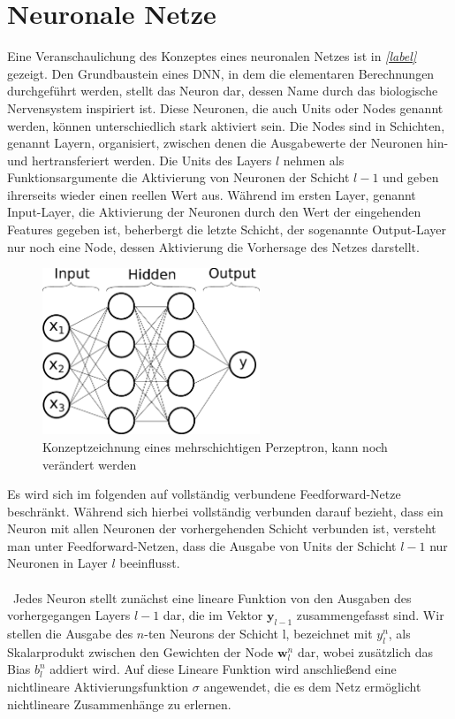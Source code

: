 \section{Neuronale Netze}
Eine Veranschaulichung des Konzeptes eines neuronalen Netzes ist in \textit{\autoref{label}} gezeigt.
Den Grundbaustein eines DNN, in dem die elementaren Berechnungen durchgeführt werden, stellt das Neuron dar, dessen Name durch das biologische Nervensystem inspiriert ist.
Diese Neuronen, die auch Units oder Nodes genannt werden, können unterschiedlich stark aktiviert sein. Die Nodes sind in Schichten, genannt Layern, organisiert, zwischen denen die Ausgabewerte der Neuronen hin- und hertransferiert werden. Die Units des Layers $l$ nehmen als Funktionsargumente die Aktivierung von Neuronen der Schicht $l-1$ und geben ihrerseits wieder einen reellen Wert aus. Während im ersten Layer, genannt Input-Layer, die Aktivierung der Neuronen durch den Wert der eingehenden Features gegeben ist, beherbergt die letzte Schicht, der sogenannte Output-Layer nur noch eine Node, dessen Aktivierung die Vorhersage des Netzes darstellt. \\
\begin{figure}
	\includegraphics[width=65mm]{graphics/NeuralNetwork}
	\caption{Konzeptzeichnung eines mehrschichtigen Perzeptron, kann noch verändert werden}
\end{figure}
Es wird sich im folgenden auf vollständig verbundene Feedforward-Netze beschränkt. Während sich hierbei vollständig verbunden darauf bezieht, dass ein Neuron mit allen Neuronen der vorhergehenden Schicht verbunden ist, versteht man unter Feedforward-Netzen, dass die Ausgabe von Units der Schicht $l-1$ nur Neuronen in Layer $l$ beeinflusst. \\
\\\
Jedes Neuron stellt zunächst eine lineare Funktion von den Ausgaben des vorhergegangen Layers $l-1$ dar, die im Vektor $\mathbf{y}_{l-1}$ zusammengefasst sind. Wir stellen die Ausgabe des $n$-ten Neurons der Schicht l, bezeichnet mit $y_l^n$, als Skalarprodukt zwischen den Gewichten der Node $\mathbf{w}_{l}^n$ dar, wobei zusätzlich das Bias $b_l^n$ addiert wird. Auf diese Lineare Funktion wird anschließend eine nichtlineare Aktivierungsfunktion $\sigma$ angewendet, die es dem Netz ermöglicht nichtlineare Zusammenhänge zu erlernen.
